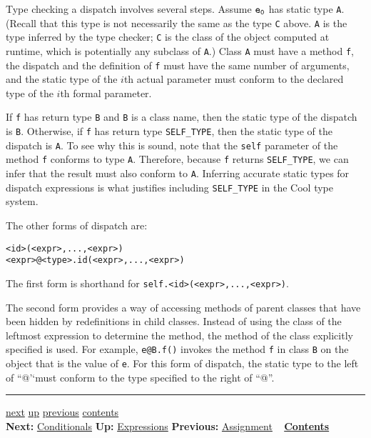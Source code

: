 \documentclass[]{article}
\begin{document}
Type checking a dispatch involves several steps. Assume $\tt e_0$ has
static type \texttt{A}. (Recall that this type is not necessarily the
same as the type \texttt{C} above. \texttt{A} is the type inferred by
the type checker; \texttt{C} is the class of the object computed at
runtime, which is potentially any subclass of \texttt{A}.) Class
\texttt{A} must have a method \texttt{f}, the dispatch and the
definition of \texttt{f} must have the same number of arguments, and the
static type of the $i$th actual parameter must conform to the declared
type of the $i$th formal parameter.

If \texttt{f} has return type \texttt{B} and \texttt{B} is a class name,
then the static type of the dispatch is \texttt{B}. Otherwise, if
\texttt{f} has return type \texttt{SELF\_TYPE}, then the static type of
the dispatch is \texttt{A}. To see why this is sound, note that the
\texttt{self} parameter of the method \texttt{f} conforms to type
\texttt{A}. Therefore, because \texttt{f} returns \texttt{SELF\_TYPE},
we can infer that the result must also conform to \texttt{A}. Inferring
accurate static types for dispatch expressions is what justifies
including \texttt{SELF\_TYPE} in the Cool type system.

The other forms of dispatch are:

\begin{verbatim}
<id>(<expr>,...,<expr>)
<expr>@<type>.id(<expr>,...,<expr>)
\end{verbatim}

The first form is shorthand for
\texttt{self.\textless{}id\textgreater{}(\textless{}expr\textgreater{},...,\textless{}expr\textgreater{})}.

The second form provides a way of accessing methods of parent classes
that have been hidden by redefinitions in child classes. Instead of
using the class of the leftmost expression to determine the method, the
method of the class explicitly specified is used. For example,
\texttt{e@B.f()} invokes the method \texttt{f} in class \texttt{B} on
the object that is the value of \texttt{e}. For this form of dispatch,
the static type to the left of ``@'`must conform to the type specified
to the right of ``@''.

\begin{center}\rule{3in}{0.4pt}\end{center}

\href{node18.html}{next} \href{node13.html}{up}
\href{node16.html}{previous} \href{node1.html}{contents} \\
\textbf{Next:} \href{node18.html}{Conditionals} \textbf{Up:}
\href{node13.html}{Expressions} \textbf{Previous:}
\href{node16.html}{Assignment} ~ \textbf{\href{node1.html}{Contents}}
\end{document}
